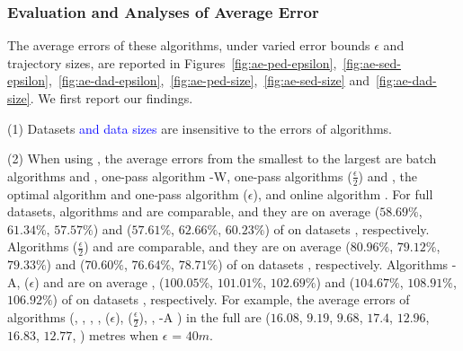 






\subsubsection{Evaluation and Analyses of Average Error}
\label{sec-ae}
The average errors of these algorithms, under varied error bounds $\epsilon$ and trajectory sizes, are reported in Figures~\ref{fig:ae-ped-epsilon},~\ref{fig:ae-sed-epsilon},~\ref{fig:ae-dad-epsilon},~\ref{fig:ae-ped-size},~\ref{fig:ae-sed-size} and~\ref{fig:ae-dad-size}.
We first report our findings.

\sstab (1) {Datasets \textcolor{blue}{and data sizes} are insensitive to the errors of \lsa algorithms.}

\sstab (2) When using \ped, the average errors from the smallest
to the largest are batch algorithms \tpa and \dpa, one-pass
algorithm \operb-W, one-pass
algorithms \siped($\frac{\epsilon}{2}$) and \operb, the optimal algorithm \opt and one-pass algorithm \siped(${\epsilon}$), and online algorithm \bqsa.
%
For full datasets, algorithms \tpa and \dpa are comparable, and they are on average ($58.69\%$, $61.34\%$,
$57.57\%$) and ($57.61\%$, $62.66\%$, $60.23\%$) of \opt on datasets \dSets, respectively.
Algorithms \siped($\frac{\epsilon}{2}$) and \operb are comparable, and they are on average
($80.96\%$, $79.12\%$, $79.33\%$) and ($70.60\%$, $76.64\%$, $78.71\%$) of \opt on datasets \dSets, respectively.
%
Algorithms {\operb-A}, \siped(${\epsilon}$) and \bqsa are on average , ($100.05\%$, $101.01\%$, $102.69\%$) and ($104.67\%$, $108.91\%$, $106.92\%$) of \opt on datasets \dSets, respectively.
For example, the average errors of algorithms
(\opt, \tpa, \dpa, \bqsa, \siped(${\epsilon}$), \siped($\frac{\epsilon}{2}$), \operb, {\operb-A} ) in the full \mopsi are ($16.08$, $9.19$, $9.68$, $17.4$, $12.96$, $16.83$, $12.77$, ) metres when $\epsilon$ = $40m$.

